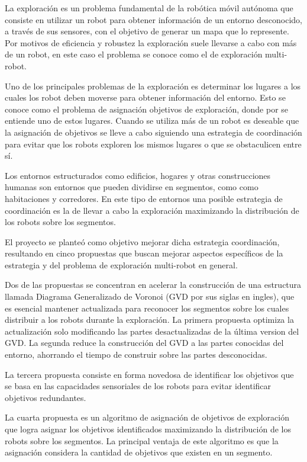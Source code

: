 La exploración es un problema fundamental de la robótica móvil autónoma que
consiste en utilizar un robot para obtener información de un entorno
desconocido, a través de sus sensores, con el objetivo de generar un mapa que lo
represente. Por motivos de eficiencia y robustez la exploración suele llevarse
a cabo con más de un robot, en este caso el problema se conoce como el de
exploración multi-robot.

Uno de los principales problemas de la exploración es determinar los lugares a
los cuales los robot deben moverse para obtener información del entorno. Esto
se conoce como el problema de asignación objetivos de exploración, donde por
 se entiende uno de estos lugares. Cuando se
utiliza más de un robot es deseable que la asignación de objetivos se lleve
a cabo siguiendo una estrategia de coordinación para evitar que los robots
exploren los mismos lugares o que se obstaculicen entre sí.

Los entornos estructurados como edificios, hogares y otras construcciones
humanas son entornos que pueden dividirse en segmentos, como como habitaciones
y corredores. En este tipo de entornos una posible estrategia de coordinación
es la de llevar a cabo la exploración maximizando la distribución de los
robots sobre los segmentos. 

El proyecto se planteó como objetivo mejorar dicha estrategia coordinación,
resultando en cinco propuestas que buscan mejorar aspectos específicos de la
estrategia y del problema de exploración multi-robot en general.

Dos de las propuestas se concentran en acelerar la construcción de una
estructura llamada Diagrama Generalizado de Voronoi (GVD por sus siglas en
ingles), que es esencial mantener actualizada para reconocer los segmentos
sobre los cuales distribuir a los robots durante la exploración. La primera
propuesta optimiza la actualización solo modificando las partes desactualizadas 
de la última version del GVD. La segunda reduce la construcción del GVD a las
partes conocidas del entorno, ahorrando el tiempo de construir sobre las
partes desconocidas.

La tercera propuesta consiste en forma novedosa de identificar los objetivos
que se basa en las capacidades sensoriales de los robots para evitar
identificar objetivos redundantes.

La cuarta propuesta es un algoritmo de asignación de objetivos de exploración que
logra asignar los objetivos identificados maximizando la distribución de los
robots sobre los segmentos. La principal ventaja de este algoritmo es que la
asignación considera la cantidad de objetivos que existen en un segmento.

